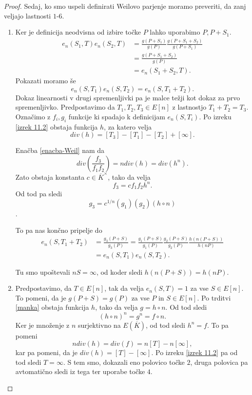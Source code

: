 \documentclass[12pt,a4paper,twoside]{article}
\theoremstyle{definition} %
\theoremstyle{plain} %
\numberwithin{equation}{section}  %
\begin{document}
\begin{proof}
Sedaj, ko smo uspeli definirati Weilovo parjenje moramo preveriti, da zanj veljajo lastnosti $1$-$6$.
\begin{enumerate}
\item Ker je definicija neodvisna od izbire točke $P$ lahko uporabimo $P,P+S_1$.
\begin{align}
e_n(S_1,T)e_n(S_2,T) &{}= \frac{g(P+S_1)}{g(P)} \frac{g(P+S_1+S_2)}{g(P+S_1)} \nonumber \\
&{} = \frac{g(P+S_1+S_2)}{g(P)} \nonumber \\
&{} = e_n(S_1+S_2,T). \nonumber
\end{align}
Pokazati moramo še
$$e_n(S,T_1)e_n(S,T_2) = e_n(S,T_1+T_2).$$
Dokaz linearnosti v drugi spremenljivki pa je malce težji kot dokaz za prvo spremenljivko.
Predpostavimo da $T_1,T_2,T_3 \in E[n]$ z lastnostjo $T_1 +T_2 = T_3.$ Označimo z $f_i,g_i$ funkcije ki spadajo k definicijam $e_n(S,T_i)$.
Po izreku \ref{izrek 11.2} obstaja funkcija $h$, za katero velja
$$div(h) = [T_3]-[T_1]-[T_2] + [\infty].$$

Enačba \ref{enacba-Weil} nam da
$$div \left(  \frac{f_3}{f_1f_2}\right) = n div(h) = div(h^n).$$
Zato obstaja konstanta $c \in \overline{K}^{\times}$, tako da velja
$$f_3 = cf_1f_2h^n.$$
Od tod pa sledi
$$g_3 = c^{1/n}(g_1)(g_2)(h \circ n)$$.

To pa nas končno pripelje do
\begin{align}
e_n(S,T_1+T_2) &{}= \frac{g_3(P+S)}{g_3(P)} = \frac{g_1(P+S)}{g_1(P)} \frac{g_2(P+S)}{g_2(P)} \frac{h(n(P+S))}{h(nP)} \nonumber \\
&{} = e_n(S,T_1)e_n(S,T_2). \nonumber
\end{align}

Tu smo upoštevali $nS = \infty$, od koder sledi $h(n(P+S)) = h(nP)$.

\item Predpostavimo, da $T \in E[n]$, tak da velja $e_n(S,T)=1$ za vse $S \in E[n]$. To pomeni, da je $g(P+S) = g(P)$ za vse $P$ in $S \in E[n]$. Po trditvi \ref{manka}%
obstaja funkcija $h$, tako da velja $g = h \circ n$. Od tod sledi 
$$(h \circ n) ^n = g^n = f \circ n.$$
Ker je množenje z $n$ surjektivno na $E(\overline{K})$, od tod sledi $h^n = f$. %
To pa pomeni
$$ndiv(h) = div(f) = n[T]-n[\infty],$$
kar pa pomeni, da je $div(h) = [T] - [\infty]$. Po izreku \ref{izrek 11.2} pa od tod sledi $T = \infty$. S tem smo, dokazali eno polovico točke $2$, druga polovica pa avtomatično sledi iz tega ter uporabe točke $4$.


\end{enumerate}
\end{proof}
\end{document}
